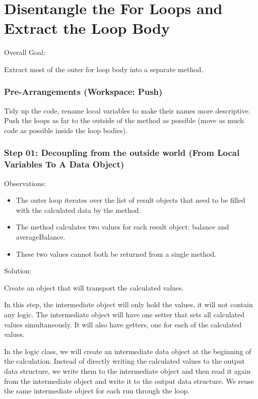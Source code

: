 \documentclass[a4paper,fleqn,titlepage,11pt]{article}
\begin{document}
\part{Disentangle the For Loops and Extract the Loop Body}

Overall Goal:

Extract most of the outer for loop body into a separate method.

\section*{Pre-Arrangements (Workspace: Push)}

Tidy up the code, rename local variables to make their names more descriptive.
Push the loops as far to the outside of the method as possible (move as much code as possible inside the loop bodies).

\section*{Step 01: Decoupling from the outside world (From Local Variables To A Data Object)}

Observations:
\begin{itemize}
\item The outer loop iterates over the list of result objects that need to be filled with the calculated data by the method.
\item The method calculates two values for each result object: balance and averageBalance. 
\item These two values cannot both be returned from a single method.
\end{itemize}

Solution:

Create an object that will transport the calculated values. 

In this step, the intermediate object will only hold the values, it will not contain any logic. The intermediate object will have one setter that sets all calculated values simultaneously. It will also have getters, one for each of the calculated values.

In the logic class, we will create an intermediate data object at the beginning of the calculation. Instead of directly writing the calculated values to the output data structure, we write them to the intermediate object and then read it again from the intermediate object and write it to the output data structure. We reuse the same intermediate object for each run through the loop.
\end{document}
